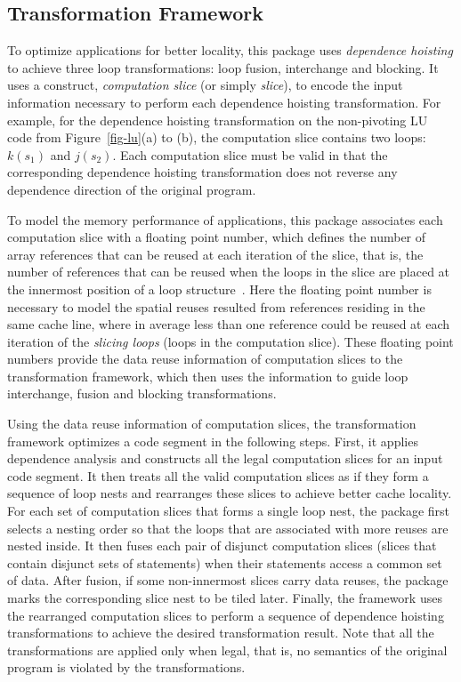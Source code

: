 \subsection { Transformation Framework}

To optimize applications for better locality,
this package  uses {\it dependence hoisting} to
achieve three loop transformations: loop fusion,
interchange and blocking. 
It uses a construct, {\it computation slice} (or simply {\it slice}), 
to encode the input information necessary to perform
each dependence hoisting transformation.
For example, for the dependence
hoisting transformation on the non-pivoting LU code
from Figure~\ref {fig-lu}(a) to (b), the
computation slice contains two loops: $k(s_1)$ and $j(s_2)$.
Each computation slice must be valid in that
the corresponding dependence hoisting transformation
does not reverse any dependence direction of the original
program.

To model the memory performance of applications, this package
associates each computation slice with a floating point
number, which defines the number of array references that can be reused 
at each iteration of the slice,  that is, the number of references
that can be reused when the loops in the slice are placed
at the innermost position of a loop structure~\cite{AK:Book}.
Here the floating point number is necessary 
to model the spatial reuses resulted from references residing in the same cache line,
where in average less than one reference could be reused at each iteration
of the {\it slicing loops} (loops in the computation slice).
These floating point numbers provide the data reuse information of
computation slices to the transformation framework, which
then uses the information to guide loop interchange, fusion and blocking
transformations. 

Using the data reuse information of computation slices,
the transformation framework optimizes a code segment in the
following steps.
First, it applies dependence analysis and constructs all the legal computation slices
for an input code segment. It then treats all the
valid computation slices as if they form a sequence of loop nests and
rearranges these slices to achieve better cache locality.
For each set of computation slices
that forms a single loop nest, the package first selects a nesting order so that
the loops that are associated with more reuses are nested inside. 
It then fuses each pair of disjunct computation slices (slices that contain disjunct
sets of statements) when their statements access a common set of data. 
After fusion, if some non-innermost slices
carry data reuses, the package marks the corresponding slice nest to be tiled later.
Finally, the framework uses the rearranged computation slices to
perform a sequence of dependence hoisting
transformations to achieve the desired transformation result.
Note  that all the transformations are applied only when legal, that is, no semantics
of the original program is violated by the transformations.

